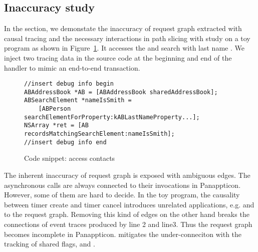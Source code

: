 \subsection{Inaccuracy study} \label{sec:toystudy}

In the section, we demonstate the inaccuracy of request graph extracted with
causal tracing and the necessary interactions in path slicing with study on a
toy program as shown in Figure~\ref{fig:toyapp}. It accesses the 
and search with last name . We inject two tracing data in the source
code at the beginning and end of the handler to mimic an end-to-end transaction.

\begin{figure}[t]
\begin{lstlisting}
//insert debug info begin
ABAddressBook *AB = [ABAddressBook sharedAddressBook];
ABSearchElement *nameIsSmith =
	[ABPerson searchElementForProperty:kABLastNameProperty...];
NSArray *ret = [AB recordsMatchingSearchElement:nameIsSmith]; 
//insert debug info end
\end{lstlisting}
\vspace{-0.5cm}
    \caption{Code snippet: access contacts}
    \label{fig:toyapp}
\end{figure}

The inherent inaccuracy of request graph is exposed with ambiguous edges. The
asynchronous calls are always connected to their invocations in Panappticon.
However, some of them are hard to decide. In the toy program, the causality
between timer create and timer cancel introduces unrelated applications, e.g.
 and  to the request graph. Removing this kind of edges
on the other hand breaks the connections of event traces produced by line 2
and line3. Thus the request graph becomes incomplete in Panappticon. \xxx
mitigates the under-conneciton with the tracking of shared flags,  and
.

